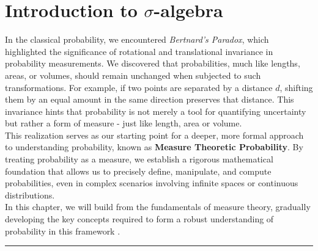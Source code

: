 \chapter{Introduction to $\sigma$-algebra}

In the classical probability, we encountered \textit{Bertnard's Paradox}, which highlighted the significance of rotational and translational invariance in probability measurements. We discovered that probabilities, much like lengths, areas, or volumes, should remain unchanged when subjected to such transformations. For example, if two points are separated by a distance $d$, shifting them by an equal amount in the same direction preserves that distance. This invariance hints that probability is not merely a tool for quantifying uncertainty but rather a form of measure - just like length, area or volume. \\

This realization serves as our starting point for a deeper, more formal approach to understanding probability, known as \textbf{Measure Theoretic Probability}. By treating probability as a measure, we establish a rigorous mathematical foundation that allows us to precisely define, manipulate, and compute probabilities, even in complex scenarios involving infinite spaces or continuous distributions. \\

In this chapter, we will build from the fundamentals of measure theory, gradually developing the key concepts required to form a robust understanding of probability in this framework \cite{probabilityfoundations}.





\vspace{30pt}
\hrule